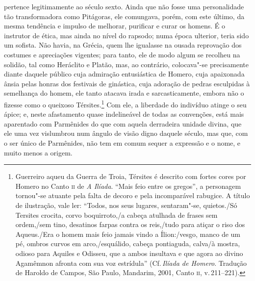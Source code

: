 pertence legitimamente ao século sexto. Ainda que não fosse uma personalidade
tão transformadora como Pitágoras, ele comungava, porém, com este último, da
mesma tendência e impulso de melhorar, purificar e curar os homens. É o
instrutor de ética, mas ainda no nível do rapsodo; numa época ulterior, teria
sido um sofista. Não havia, na Grécia, quem lhe igualasse na ousada
reprovação dos costumes e apreciações vigentes; para tanto, ele de modo algum
se recolheu na solidão, tal como Heráclito e Platão, mas, ao contrário,
colocava"-se precisamente diante daquele público cuja admiração entusiástica
de Homero, cuja apaixonada ânsia pelas honras dos festivais de ginástica,
cuja adoração de pedras esculpidas à semelhança do homem, ele tanto atacava
irada e sarcasticamente, embora não o fizesse como o queixoso
Térsites.\footnote{ Guerreiro aqueu da Guerra de Troia, Térsites é descrito
com fortes cores por Homero no Canto \textsc{ii} de \textit{A Ilíada}. ``Mais
feio entre os gregos'', a personagem tornou"-se atuante pela falta de decoro
e pela incomparável rabugice. A título de ilustração, vale ler: ``Todos, nos
seus lugares, sentaram"-se, quietos./Só Tersites crocita, corvo boquirroto,/a
cabeça atulhada de frases sem ordem,/sem tino, desatinos farpas contra os
reis,/tudo para atiçar o riso dos Aqueus./Era o homem mais feio jamais vindo
a Ílion:/vesgo, manco de um pé, ombros curvos em arco,/esquálido, cabeça
pontiaguda, calva/à mostra, odioso para Aquiles e Odisseu, que a ambos
insultava e que agora ao divino Agamêmnon afronta com sua voz estrídula''
(Cf.\,\textit{Ilíada de Homero}. Tradução de Haroldo de Campos, São Paulo,
Mandarim, 2001, Canto \textsc{ii}, v.\,211--221).} Com ele, a liberdade do
indivíduo atinge o seu ápice; e, neste afastamento quase indelineável de
todas as convenções, está mais aparentado com Parmênides do que com aquela
derradeira unidade divina, que ele uma vez vislumbrou num ângulo de visão
digno daquele século, mas que, com o ser único de Parmênides, não tem em
comum sequer a expressão e o nome, e muito menos a origem.

